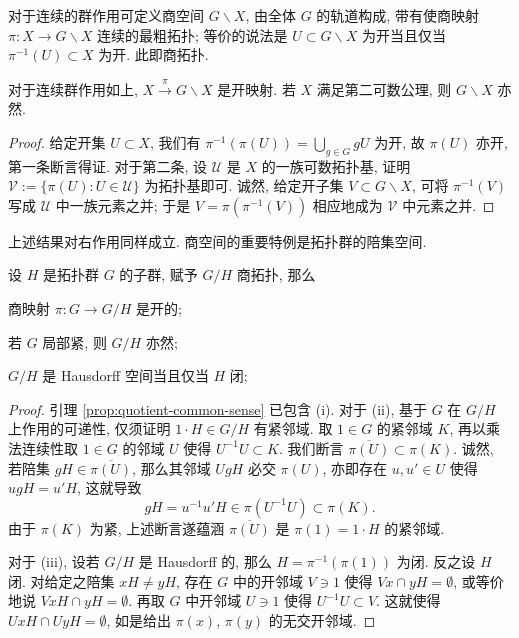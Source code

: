 对于连续的群作用可定义商空间 $G \backslash X$, 由全体 $G$ 的轨道构成, 带有使商映射 $\pi: X \to G \backslash X$ 连续的最粗拓扑; 等价的说法是 $U \subset G \backslash X$ 为开当且仅当 $\pi^{-1}(U) \subset X$ 为开. 此即商拓扑. 

\begin{lemma}\label{prop:quotient-common-sense}
	对于连续群作用如上, $X \xrightarrow{\pi} G \backslash X$ 是开映射. 若 $X$ 满足第二可数公理, 则 $G \backslash X$ 亦然.
\end{lemma}
\begin{proof}
	给定开集 $U \subset X$, 我们有 $\pi^{-1}(\pi(U)) = \bigcup_{g \in G} gU$ 为开, 故 $\pi(U)$ 亦开, 第一条断言得证. 对于第二条, 设 $\mathcal{U}$ 是 $X$ 的一族可数拓扑基, 证明 $\mathcal{V} := \{\pi(U) : U \in \mathcal{U} \}$ 为拓扑基即可. 诚然, 给定开子集 $V \subset G \backslash X$, 可将 $\pi^{-1}(V)$ 写成 $\mathcal{U}$ 中一族元素之并; 于是 $V = \pi(\pi^{-1}(V))$ 相应地成为 $\mathcal{V}$ 中元素之并.
\end{proof}
上述结果对右作用同样成立. 商空间的重要特例是拓扑群的陪集空间.

\begin{proposition}\label{prop:coset-space}
	设 $H$ 是拓扑群 $G$ 的子群, 赋予 $G/H$ 商拓扑, 那么
	\begin{compactenum}[(i)]
		\item 商映射 $\pi: G \to G/H$ 是开的;
		\item 若 $G$ 局部紧, 则 $G/H$ 亦然;
		\item $G/H$ 是 Hausdorff 空间当且仅当 $H$ 闭;
	\end{compactenum}
\end{proposition}
\begin{proof}
	引理 \ref{prop:quotient-common-sense} 已包含 (i). 对于 (ii), 基于 $G$ 在 $G/H$ 上作用的可递性, 仅须证明 $1 \cdot H \in G/H$ 有紧邻域. 取 $1 \in G$ 的紧邻域 $K$, 再以乘法连续性取 $1 \in G$ 的邻域 $U$ 使得 $U^{-1} U \subset K$. 我们断言 $\overline{\pi(U)} \subset \pi(K)$. 诚然, 若陪集 $gH \in \overline{\pi(U)}$, 那么其邻域 $UgH$ 必交 $\pi(U)$, 亦即存在 $u, u' \in U$ 使得 $ugH = u'H$, 这就导致
	\[ gH = u^{-1} u'H \in \pi(U^{-1} U) \subset \pi(K). \]
	由于 $\pi(K)$ 为紧, 上述断言遂蕴涵 $\overline{\pi(U)}$ 是 $\pi(1) = 1 \cdot H$ 的紧邻域.
	
	对于 (iii), 设若 $G/H$ 是 Hausdorff 的, 那么 $H = \pi^{-1}(\pi(1))$ 为闭. 反之设 $H$ 闭. 对给定之陪集 $xH \neq yH$, 存在 $G$ 中的开邻域 $V \ni 1$ 使得 $Vx \cap yH = \emptyset$, 或等价地说 $VxH \cap yH = \emptyset$. 再取 $G$ 中开邻域 $U \ni 1$ 使得 $U^{-1} U \subset V$. 这就使得 $UxH \cap UyH = \emptyset$, 如是给出 $\pi(x)$, $\pi(y)$ 的无交开邻域.
\end{proof}

